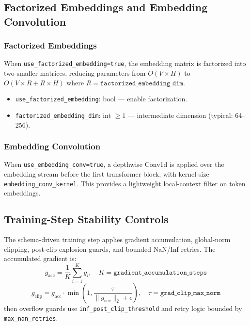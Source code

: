 \subsection{Factorized Embeddings and Embedding Convolution}

\subsubsection{Factorized Embeddings}
When \texttt{use\_factorized\_embedding=true}, the embedding matrix is factorized into two smaller matrices, reducing parameters from $O(V \times H)$ to $O(V \times R + R \times H)$ where $R = \texttt{factorized\_embedding\_dim}$.
\begin{itemize}[leftmargin=*]
    \item \texttt{use\_factorized\_embedding}: bool --- enable factorization.
    \item \texttt{factorized\_embedding\_dim}: int $\ge 1$ --- intermediate dimension (typical: 64--256).
\end{itemize}

\subsubsection{Embedding Convolution}
When \texttt{use\_embedding\_conv=true}, a depthwise Conv1d is applied over the embedding stream before the first transformer block, with kernel size \texttt{embedding\_conv\_kernel}. This provides a lightweight local-context filter on token embeddings.

\subsection{Training-Step Stability Controls}

The schema-driven training step applies gradient accumulation, global-norm clipping, post-clip explosion guards, and bounded NaN/Inf retries. The accumulated gradient is:
\[
g_{\text{acc}}=\frac{1}{K}\sum_{i=1}^{K} g_i,\quad K=\texttt{gradient\_accumulation\_steps}
\]
\[
g_{\text{clip}} = g_{\text{acc}}\cdot
\min\left(1,\frac{\tau}{\|g_{\text{acc}}\|_2+\epsilon}\right),\quad
\tau=\texttt{grad\_clip\_max\_norm}
\]
then overflow guards use \texttt{inf\_post\_clip\_threshold} and retry logic bounded by \texttt{max\_nan\_retries}.

